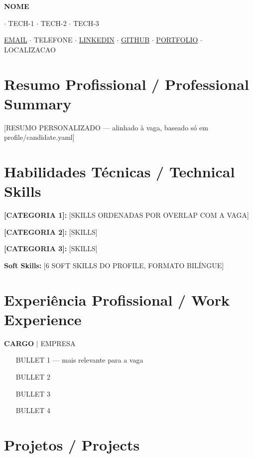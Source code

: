 \documentclass[10pt,a4paper]{article}
\newcommand{\cvdate}[1]{{\small\color{darkgray}#1}}
\newcommand{\cvloc}[1]{{\small\color{darkgray}#1}}
\begin{document}
\begin{center}
  {\fontsize{18}{22}\bfseries {{NOME}}}\par\vspace{2pt}
  {\fontsize{10.5}{13} $\cdot$ {{TECH-1}} $\cdot$ {{TECH-2}} $\cdot$ {{TECH-3}}}\par\vspace{2pt}
  {\small
  \href{mailto:{{EMAIL}}}{{{EMAIL}}} $\cdot$
  {{TELEFONE}} $\cdot$
  \href{https://{{LINKEDIN}}}{{{LINKEDIN}}} $\cdot$
  \href{https://{{GITHUB}}}{{{GITHUB}}} $\cdot$
  \href{https://{{PORTFOLIO}}}{{{PORTFOLIO}}} $\cdot$
  {{LOCALIZACAO}}
  }
\end{center}

\section{Resumo Profissional / Professional Summary}
[RESUMO PERSONALIZADO — alinhado à vaga, baseado só em profile/candidate.yaml]

\section{Habilidades T\'{e}cnicas / Technical Skills}
\textbf{[CATEGORIA 1]:} [SKILLS ORDENADAS POR OVERLAP COM A VAGA]\par
\textbf{[CATEGORIA 2]:} [SKILLS]\par
\textbf{[CATEGORIA 3]:} [SKILLS]\par
\textbf{Soft Skills:} [6 SOFT SKILLS DO PROFILE, FORMATO BILÍNGUE]

\section{Experi\^{e}ncia Profissional / Work Experience}

{\fontsize{10.5}{13}\bfseries {{CARGO}}} $\vert$ {{EMPRESA}} \hfill \cvdate{{{PERIODO}}}\par
\cvloc{{{LOCAL}}}\par

\begin{itemize}
  \item [BULLET 1 — mais relevante para a vaga]
  \item [BULLET 2]
  \item [BULLET 3]
  \item [BULLET 4]
\end{itemize}

\section{Projetos / Projects}
\end{document}
